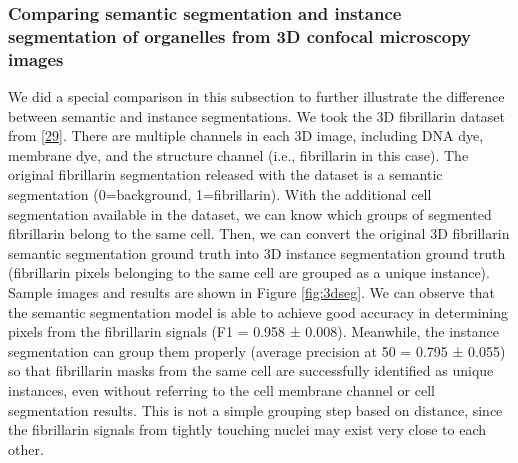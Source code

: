 \hypertarget{comparing-semantic-segmentation-and-instance-segmentation-of-organelles-from-3d-confocal-microscopy-images}{%
\subsubsection{Comparing semantic segmentation and instance segmentation of organelles from 3D confocal microscopy images}\label{comparing-semantic-segmentation-and-instance-segmentation-of-organelles-from-3d-confocal-microscopy-images}}

We did a special comparison in this subsection to further illustrate the difference between semantic and instance segmentations. We took the 3D fibrillarin dataset from {[}\protect\hyperlink{ref-5sGcmDuy}{29}{]}. There are multiple channels in each 3D image, including DNA dye, membrane dye, and the structure channel (i.e., fibrillarin in this case). The original fibrillarin segmentation released with the dataset is a semantic segmentation (0=background, 1=fibrillarin). With the additional cell segmentation available in the dataset, we can know which groups of segmented fibrillarin belong to the same cell. Then, we can convert the original 3D fibrillarin semantic segmentation ground truth into 3D instance segmentation ground truth (fibrillarin pixels belonging to the same cell are grouped as a unique instance). Sample images and results are shown in Figure \ref{fig:3dseg}. We can observe that the semantic segmentation model is able to achieve good accuracy in determining pixels from the fibrillarin signals (F1 = 0.958 ± 0.008). Meanwhile, the instance segmentation can group them properly (average precision at 50 = 0.795 ± 0.055) so that fibrillarin masks from the same cell are successfully identified as unique instances, even without referring to the cell membrane channel or cell segmentation results. This is not a simple grouping step based on distance, since the fibrillarin signals from tightly touching nuclei may exist very close to each other.

